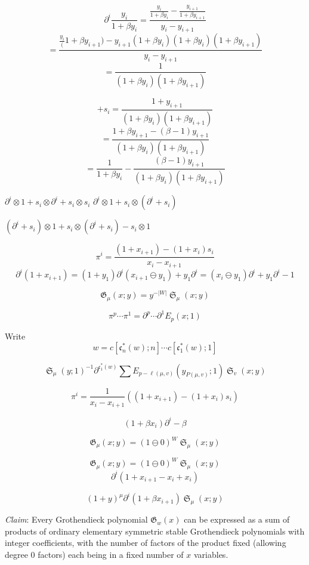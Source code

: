\documentclass{amsart}
\theoremstyle{definition}
\theoremstyle{remark}
\numberwithin{equation}{subsection}
\DeclareMathOperator{\sch}{\mathfrak{S}}
\newcommand{\code}{\mathfrak{c}}
\begin{document}
$$\partial^i\frac{y_i}{1+\beta y_i} = \frac{\frac{y_i}{1 + \beta y_i} - \frac{y_{i+1}}{1+\beta y_{i+1}}}{y_i - y_{i+1}}$$
$$= \frac{\frac{y_i}(1+\beta y_{i+1}) - y_{i+1}(1+\beta y_i){(1 + \beta y_i)(1+\beta y_{i+1})}}{y_i - y_{i+1}}$$
$$= \frac{1}{(1 + \beta y_i)(1+\beta y_{i+1})}$$

$$+s_i= \frac{1 + y_{i+1}}{(1 + \beta y_i)(1+\beta y_{i+1})}$$
$$= \frac{1 + \beta y_{i+1} - (\beta - 1)y_{i+1}}{(1 + \beta y_i)(1+\beta y_{i+1})}$$
$$= \frac 1{1+\beta y_i} - \frac{(\beta - 1)y_{i+1}}{(1 + \beta y_i)(1+\beta y_{i+1})}$$


$\partial^i\otimes 1 + s_i\otimes \partial^i + s_i\otimes s_i$
$\partial^i\otimes 1 + s_i\otimes (\partial^i + s_i)$

$(\partial^i + s_i)\otimes 1 + s_i\otimes (\partial^i + s_i) - s_i \otimes 1$


$$\pi^i = \frac{(1 + x_{i+1}) - (1 + x_i)s_i}{x_i - x_{i+1}}$$
$$\partial^i(1+ x_{i+1})=(1+y_1)\partial^i(x_{i+1}\ominus y_1) + y_1\partial^i = (x_i\ominus y_1)\partial^i + y_1\partial^i - 1$$


$$\mathfrak{G}_{\mu}(x;y) = y^{-|W|}\sch_{\mu}(x;y)$$

$$\pi^{p}\cdots \pi^1 = \partial^{p}\cdots \partial^1E_p(x;1)$$

Write
$$w = c[\code^*_n(w);n]\cdots c[\code^*_1(w);1]$$

$$\sch_{\mu}(y;1)^{-1}\partial^{\code^*_1(w)}\sum E_{p-\ell(\mu, v)}(y_{P(\mu, v)};1)\sch_v(x;y)$$

$$\pi^i = \frac{1}{x_i - x_{i+1}}((1 + x_{i + 1}) - (1 + x_i)s_i)$$


$$(1 + \beta x_i)\partial^i - \beta$$

$$\mathfrak{G}_{\mu}(x;y) = (1\ominus 0)^{W}\sch_{\mu}(x;y)$$

$$\mathfrak{G}_{\mu}(x;y) = (1\ominus 0)^{W}\sch_{\mu}(x;y)$$
$$\partial^i(1 + x_{i+1} - x_i + x_i)$$

$$(1+ y)^{\mu}\partial^i(1 + \beta x_{i+1})\sch_{\mu}(x;y)$$




\emph{Claim}: Every Grothendieck polynomial $\mathfrak{G}_w(x)$ can be expressed as a sum of products of ordinary elementary symmetric stable Grothendieck polynomials with integer coefficients, with the number of factors of the product fixed (allowing degree $0$ factors) each being in a fixed number of $x$ variables.
\end{document}
